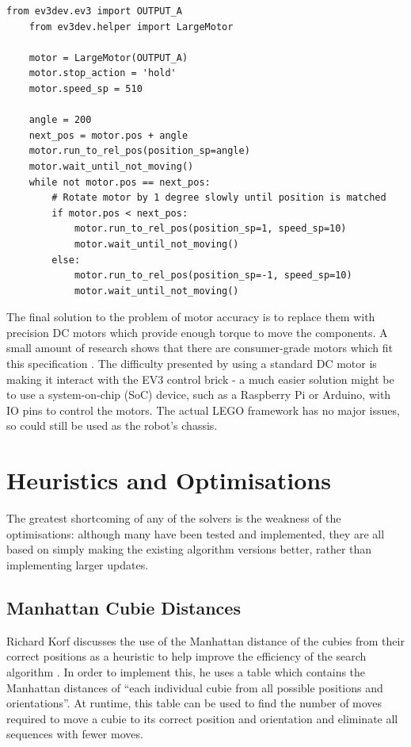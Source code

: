 \documentclass{report}
\newcommand{\lego}{LEGO }
\begin{document}
	\begin{lstlisting}[caption={Potential position validation method for the \lego motors}, label={lst:motorValidation}]
	from ev3dev.ev3 import OUTPUT_A
	from ev3dev.helper import LargeMotor
	
	motor = LargeMotor(OUTPUT_A)
	motor.stop_action = 'hold'
	motor.speed_sp = 510
	
	angle = 200
	next_pos = motor.pos + angle
	motor.run_to_rel_pos(position_sp=angle)
	motor.wait_until_not_moving()
	while not motor.pos == next_pos:
		# Rotate motor by 1 degree slowly until position is matched
		if motor.pos < next_pos:
			motor.run_to_rel_pos(position_sp=1, speed_sp=10)
			motor.wait_until_not_moving()
		else:
			motor.run_to_rel_pos(position_sp=-1, speed_sp=10)
			motor.wait_until_not_moving()\end{lstlisting}
	
	The final solution to the problem of motor accuracy is to replace them with precision DC motors which provide enough torque to move the components. A small amount of research shows that there are consumer-grade motors which fit this specification \cite{Portescap}. The difficulty presented by using a standard DC motor is making it interact with the EV3 control brick - a much easier solution might be to use a system-on-chip (SoC) device, such as a Raspberry Pi or Arduino, with IO pins to control the motors. The actual \lego framework has no major issues, so could still be used as the robot's chassis.

	\section{Heuristics and Optimisations}
	
	The greatest shortcoming of any of the solvers is the weakness of the optimisations: although many have been tested and implemented, they are all based on simply making the existing algorithm versions better, rather than implementing larger updates.
	
	\subsection{Manhattan Cubie Distances}

	Richard Korf discusses the use of the Manhattan distance of the cubies from their correct positions as a heuristic to help improve the efficiency of the search algorithm \cite{Korf1997}. In order to implement this, he uses a table which contains the Manhattan distances of \enquote{each individual cubie from all possible positions and orientations}. At runtime, this table can be used to find the number of moves required to move a cubie to its correct position and orientation and eliminate all sequences with fewer moves.
	
\end{document}
